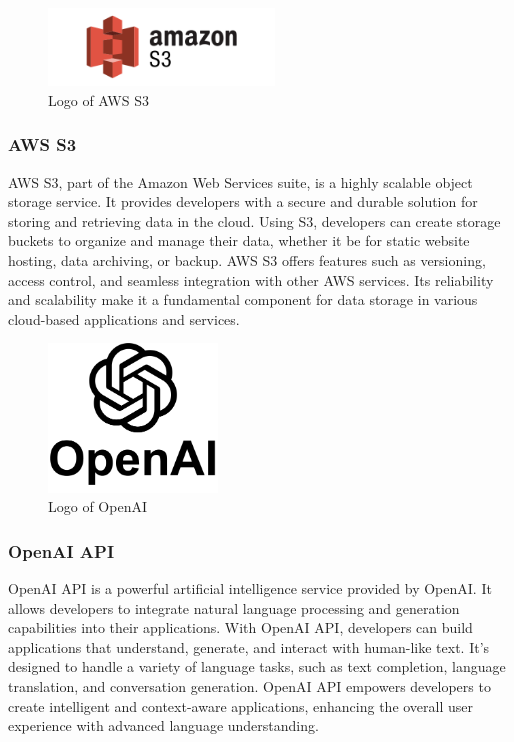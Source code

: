 \documentclass[conference]{IEEEtran}
\begin{document}
        \begin{figure}[htbp]
        \centerline{\includegraphics[width=6cm]{Images/logo/awss3.png}}
        \label{fig}
        \caption{Logo of AWS S3}
        \end{figure}
        \subsubsection{AWS S3}
        AWS S3, part of the Amazon Web Services suite, is a highly scalable object storage service. It provides developers with a secure and durable solution for storing and retrieving data in the cloud. Using S3, developers can create storage buckets to organize and manage their data, whether it be for static website hosting, data archiving, or backup. AWS S3 offers features such as versioning, access control, and seamless integration with other AWS services. Its reliability and scalability make it a fundamental component for data storage in various cloud-based applications and services.\\

        \begin{figure}[htbp]
        \centerline{\includegraphics[width=4.5cm]{Images/logo/openai.png}}
        \label{fig}
        \caption{Logo of OpenAI}
        \end{figure}
        \subsubsection{OpenAI API}
        OpenAI API is a powerful artificial intelligence service provided by OpenAI. It allows developers to integrate natural language processing and generation capabilities into their applications. With OpenAI API, developers can build applications that understand, generate, and interact with human-like text. It's designed to handle a variety of language tasks, such as text completion, language translation, and conversation generation. OpenAI API empowers developers to create intelligent and context-aware applications, enhancing the overall user experience with advanced language understanding.\\
\end{document}
